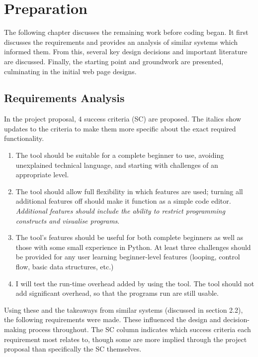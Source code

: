 \chapter{Preparation}

The following chapter discusses the remaining work before coding began. It first discusses the requirements and provides an analysis of similar systems which informed them. From this, several key design decisions and important literature are discussed. Finally, the starting point and groundwork are presented, culminating in the initial web page designs.

\section{Requirements Analysis}

In the project proposal, 4 success criteria (SC) are proposed. The italics show updates to the criteria to make them more specific about the exact required functionality.

\begin{enumerate}
    \item The tool should be suitable for a complete beginner to use, avoiding unexplained technical language, and starting with challenges of an appropriate level.

    \item The tool should allow full flexibility in which features are used; turning all additional features off should make it function as a simple code editor.\textit{ Additional features should include the ability to restrict programming constructs and visualise programs}.

    \item The tool’s features should be useful for both complete beginners as well as those with some small experience in Python. At least three challenges should be provided for any user learning beginner-level features (looping, control flow, basic data structures, etc.)

    \item I will test the run-time overhead added by using the tool. The tool should not add significant overhead, so that the programs run are still usable.
\end{enumerate}

Using these and the takeaways from similar systems (discussed in section 2.2), the following requirements were made. These influenced the design and decision-making process throughout. The SC column indicates which success criteria each requirement most relates to, though some are more implied through the project proposal than specifically the SC themselves.

